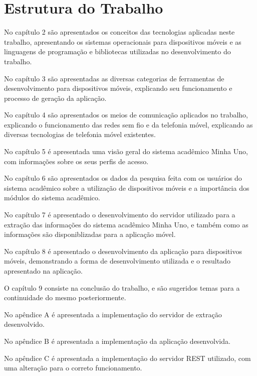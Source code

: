 \section{Estrutura do Trabalho}

No capítulo 2 são apresentados os conceitos das tecnologias aplicadas neste trabalho, apresentando os sistemas operacionais para dispositivos móveis e as linguagens de programação e bibliotecas utilizadas no desenvolvimento do trabalho.

No capítulo 3 são apresentadas as diversas categorias de ferramentas de desenvolvimento para dispositivos móveis, explicando seu funcionamento e processo de geração da aplicação.

No capítulo 4 são apresentados os meios de comunicação aplicados no trabalho, explicando o funcionamento das redes sem fio e da telefonia móvel, explicando as diversas tecnologias de telefonia móvel existentes.

No capítulo 5 é apresentada uma visão geral do sistema acadêmico Minha Uno, com informações sobre os seus perfis de acesso.

No capítulo 6 são apresentados os dados da pesquisa feita com os usuários do sistema acadêmico sobre a utilização de dispositivos móveis e a importância dos módulos do sistema acadêmico.

No capítulo 7 é apresentado o desenvolvimento do servidor utilizado para a extração das informações do sistema acadêmico Minha Uno, e também como as informações são disponiblizadas para a aplicação móvel.

No capítulo 8 é apresentado o desenvolvimento da aplicação para dispositivos móveis, demonstrando a forma de desenvolvimento utilizada e o resultado apresentado na aplicação.

O capítulo 9 consiste na conclusão do trabalho, e são sugeridos temas para a continuidade do mesmo posteriormente.

No apêndice A é apresentada a implementação do servidor de extração desenvolvido.

No apêndice B é apresentada a implementação da aplicação desenvolvida.

No apêndice C é apresentada a implementação do servidor REST utilizado, com uma alteração para o correto funcionamento.